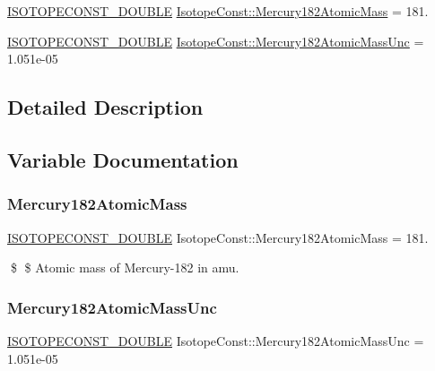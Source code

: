 \begin{DoxyCompactItemize}
\item 
\mbox{\hyperlink{group___isotope_const-_macros_ga8f45a7272ce02c0b4c65c44636ed719a}{I\+S\+O\+T\+O\+P\+E\+C\+O\+N\+S\+T\+\_\+\+D\+O\+U\+B\+LE}} \mbox{\hyperlink{group___isotope_const-_mercury-_hg182_ga6b0c5608a9f1ce228cf49ae12db81022}{Isotope\+Const\+::\+Mercury182\+Atomic\+Mass}} = 181.
\item 
\mbox{\hyperlink{group___isotope_const-_macros_ga8f45a7272ce02c0b4c65c44636ed719a}{I\+S\+O\+T\+O\+P\+E\+C\+O\+N\+S\+T\+\_\+\+D\+O\+U\+B\+LE}} \mbox{\hyperlink{group___isotope_const-_mercury-_hg182_ga6d3a5e66199772eafde213147f24e6a2}{Isotope\+Const\+::\+Mercury182\+Atomic\+Mass\+Unc}} = 1.\+051e-\/05
\end{DoxyCompactItemize}


\subsection{Detailed Description}


\subsection{Variable Documentation}
\mbox{\label{group___isotope_const-_mercury-_hg182_ga6b0c5608a9f1ce228cf49ae12db81022}} 
\subsubsection{\texorpdfstring{Mercury182\+Atomic\+Mass}{Mercury182AtomicMass}}
{\footnotesize\ttfamily \mbox{\hyperlink{group___isotope_const-_macros_ga8f45a7272ce02c0b4c65c44636ed719a}{I\+S\+O\+T\+O\+P\+E\+C\+O\+N\+S\+T\+\_\+\+D\+O\+U\+B\+LE}} Isotope\+Const\+::\+Mercury182\+Atomic\+Mass = 181.}

\$ \$ Atomic mass of Mercury-\/182 in amu. \mbox{\label{group___isotope_const-_mercury-_hg182_ga6d3a5e66199772eafde213147f24e6a2}} 
\subsubsection{\texorpdfstring{Mercury182\+Atomic\+Mass\+Unc}{Mercury182AtomicMassUnc}}
{\footnotesize\ttfamily \mbox{\hyperlink{group___isotope_const-_macros_ga8f45a7272ce02c0b4c65c44636ed719a}{I\+S\+O\+T\+O\+P\+E\+C\+O\+N\+S\+T\+\_\+\+D\+O\+U\+B\+LE}} Isotope\+Const\+::\+Mercury182\+Atomic\+Mass\+Unc = 1.\+051e-\/05}

